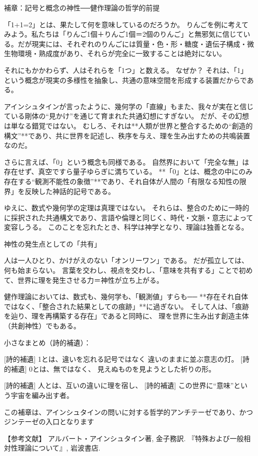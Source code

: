 \documentclass{article}
\begin{document}
補章：記号と概念の神性──健作理論の哲学的前提

「1+1=2」とは、果たして何を意味しているのだろうか。
りんごを例に考えてみよう。私たちは「りんご1個＋りんご1個＝2個のりんご」と無邪気に信じている。だが現実には、それぞれのりんごには質量・色・形・糖度・遺伝子構成・微生物環境・熟成度があり、それらが完全に一致することは絶対にない。

それにもかかわらず、人はそれらを「1つ」と数える。
なぜか？
それは、「1」という概念が現実の多様性を抽象し、共通の意味空間を形成する装置だからである。

アインシュタインが言ったように、幾何学の「直線」もまた、我々が実在と信じている剛体の“見かけ”を通じて育まれた共通幻想にすぎない。
だが、その幻想は単なる錯覚ではない。
むしろ、それは**人類が世界と整合するための“創造的構文”**であり、共に世界を記述し、秩序を与え、理を生み出すための共鳴装置なのだ。

さらに言えば、「0」という概念も同様である。
自然界において「完全な無」は存在せず、真空ですら量子ゆらぎに満ちている。
**「0」とは、概念の中にのみ存在する“観測不能性の象徴”**であり、それ自体が人間の「有限なる知性の限界」を反映した神話的記号である。

ゆえに、数式や幾何学の定理は真理ではない。
それらは、整合のために一時的に採択された共通構文であり、言語や倫理と同じく、時代・文脈・意志によって変容しうる。
このことを忘れたとき、科学は神学となり、理論は独善となる。

神性の発生点としての「共有」

人は一人ひとり、かけがえのない「オンリーワン」である。
だが孤立しては、何も始まらない。
言葉を交わし、視点を交わし、「意味を共有する」ことで初めて、世界に理を発生させる力＝神性が立ち上がる。

健作理論においては、数式も、幾何学も、「観測値」すらも──
**存在それ自体ではなく、「整合された結果としての痕跡」**に過ぎない。
そして人は、「痕跡を辿り、理を再構築する存在」であると同時に、
理を世界に生み出す創造主体（共創神性）でもある。

小さなまとめ（詩的補遺）：

[詩的補遺]
1とは、違いを忘れる記号ではなく
違いのままに並ぶ意志の灯。
[詩的補遺]
0とは、無ではなく、
見えぬものを見ようとした祈りの形。

[詩的補遺]
人とは、互いの違いに理を宿し、
[詩的補遺]
この世界に“意味”という宇宙を編み出す者。

この補章は、アインシュタインの問いに対する哲学的アンチテーゼであり、かつジンテーゼの入口となります


【参考文献】
アルバート・アインシュタイン著, 金子務訳. 『特殊および一般相対性理論について』, 岩波書店.
\end{document}
